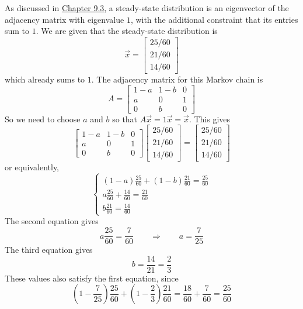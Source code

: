 \documentclass[11pt]{article}
\begin{document}
\begin{prob}[(10 pts)]
\begin{solution}
As discussed in \href{https://notes.eecs245.org/eigenvalues-and-eigenvectors/markov-chains-adjacency-matrices/}{Chapter 9.3}, a steady-state distribution is an eigenvector of the adjacency matrix with eigenvalue $1$, with the additional constraint that its entries sum to $1$. We are given that the steady-state distribution is
\[
\vec x
=
\begin{bmatrix}
25/60\\
21/60\\
14/60
\end{bmatrix}
\]
which already sums to $1$. The adjacency matrix for this Markov chain is
\[
A=
\begin{bmatrix}
1-a & 1-b & 0\\
a & 0 & 1\\
0 & b & 0
\end{bmatrix}
\]
So we need to choose $a$ and $b$ so that $A\vec x=1\vec x=\vec x$. This gives
\[
\begin{bmatrix}
1-a & 1-b & 0\\
a & 0 & 1\\
0 & b & 0
\end{bmatrix}
\begin{bmatrix}
25/60\\
21/60\\
14/60
\end{bmatrix}
=
\begin{bmatrix}
25/60\\
21/60\\
14/60
\end{bmatrix}
\]
or equivalently,
\[
\begin{cases}
(1-a)\frac{25}{60}+(1-b)\frac{21}{60}=\frac{25}{60}\\
a\frac{25}{60}+\frac{14}{60}=\frac{21}{60}\\
b\frac{21}{60}=\frac{14}{60}
\end{cases}
\]
The second equation gives
\[
a\frac{25}{60}=\frac{7}{60}
\qquad\Rightarrow\qquad
a=\frac{7}{25}
\]
The third equation gives
\[
b=\frac{14}{21}=\frac{2}{3}
\]
These values also satisfy the first equation, since
\[
(1-\frac{7}{25})\frac{25}{60}+(1-\frac{2}{3})\frac{21}{60}
=
\frac{18}{60}+\frac{7}{60}
=
\frac{25}{60}
\]
\end{solution}
\end{prob}

\newpage
\end{document}
